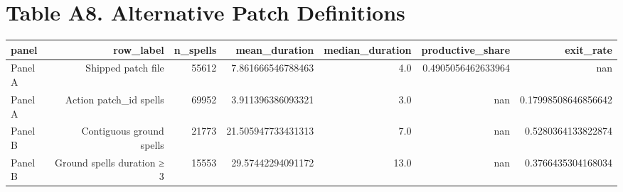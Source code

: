 \documentclass{article}
\begin{document}
\section*{Table A8. Alternative Patch Definitions}
\begin{tabular}{lrrrrrr}
\hline
panel & row_label & n_spells & mean_duration & median_duration & productive_share & exit_rate \\
\hline
Panel A & Shipped patch file & 55612 & 7.861666546788463 & 4.0 & 0.4905056462633964 & nan \\
Panel A & Action patch\_id spells & 69952 & 3.911396386093321 & 3.0 & nan & 0.17998508646856642 \\
Panel B & Contiguous ground spells & 21773 & 21.505947733431313 & 7.0 & nan & 0.5280364133822874 \\
Panel B & Ground spells duration ≥ 3 & 15553 & 29.57442294091172 & 13.0 & nan & 0.3766435304168034 \\
\hline
\end{tabular}
\end{document}
